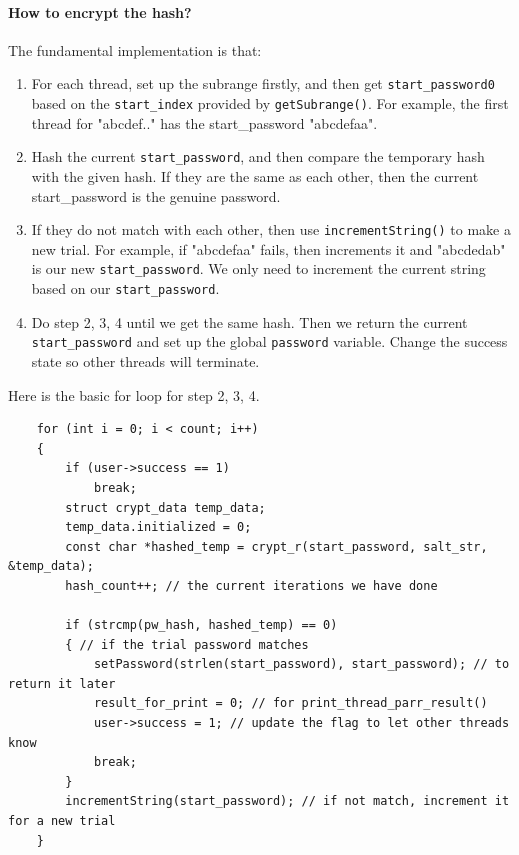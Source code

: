 \documentclass{article}
\begin{document}
\paragraph{How to encrypt the hash? }
The fundamental implementation is that:
\begin{enumerate}
	\item  For each thread, set up the subrange firstly, and then get \texttt{start\_password0} based on the \texttt{start\_index} provided by \texttt{getSubrange()}. For example, the first thread for "abcdef.." has the start\_password "abcdefaa".
	\item Hash the current \texttt{start\_password}, and then compare the temporary hash with the given hash. If they are the same as each other, then the current start\_password is the genuine password.
	\item If they do not match with each other, then use \texttt{incrementString()} to make a new trial. For example, if "abcdefaa" fails, then increments it and "abcdedab" is our new \texttt{start\_password}. We only need to increment the current string based on our \texttt{start\_password}. 
	\item Do step 2, 3, 4 until we get the same hash. Then we return the current \texttt{start\_password} and set up the global \texttt{password} variable. Change the success state so other threads will terminate.
\end{enumerate} 
Here is the basic for loop for step 2, 3, 4.
\begin{lstlisting}
	for (int i = 0; i < count; i++)
  	{
    	if (user->success == 1)
      		break;
    	struct crypt_data temp_data;
    	temp_data.initialized = 0;
    	const char *hashed_temp = crypt_r(start_password, salt_str, &temp_data);
    	hash_count++; // the current iterations we have done

    	if (strcmp(pw_hash, hashed_temp) == 0)
    	{ // if the trial password matches
      		setPassword(strlen(start_password), start_password); // to return it later
      		result_for_print = 0; // for print_thread_parr_result()
      		user->success = 1; // update the flag to let other threads know
      		break;
    	}		
    	incrementString(start_password); // if not match, increment it for a new trial
  	}
\end{lstlisting}
\end{document}

